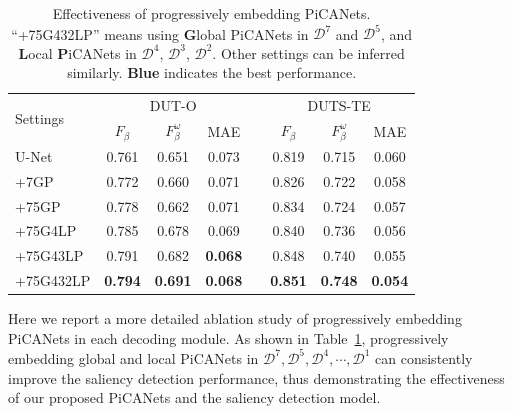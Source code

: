 \documentclass[10pt,twocolumn,letterpaper]{article}
\def\blu#1{\textbf{\color{blue} #1}} %
\begin{document}
\begin{table} [!t]
\begin{center}
\caption{Effectiveness of progressively embedding PiCANets. ``+75G432LP'' means using \textbf{G}lobal PiCANets in $\mathcal D^7$ and $\mathcal D^5$, and \textbf{L}ocal \textbf{P}iCANets in $\mathcal D^4$, $\mathcal D^3$, $\mathcal D^2$. Other settings can be inferred similarly. \blu{Blue} indicates the best performance.}
\vspace{1mm}
\label{progressiveTab}
\footnotesize
\begin{tabular}{@{}lccccccc@{}}
\toprule
\multirow{2}{*}{Settings} & \multicolumn{3}{c}{DUT-O \cite{yang2013gbmr}}  && \multicolumn{3}{c}{DUTS-TE \cite{wang2017duts}} \\
\cmidrule{2-4} \cmidrule{6-8}
                          &  $F_{\beta}$   &  $F_{\beta}^{\omega}$  &   MAE    && $F_{\beta}$   &  $F_{\beta}^{\omega}$  &   MAE  \\ \midrule
U-Net \cite{ronneberger2015unet} & 0.761   & 0.651                  & 0.073    && 0.819         & 0.715                  & 0.060  \\ \midrule
+7GP                      & 0.772          & 0.660                  & 0.071    && 0.826         & 0.722                  & 0.058  \\
+75GP                     & 0.778          & 0.662                  & 0.071    && 0.834         & 0.724                  & 0.057  \\
+75G4LP                   & 0.785          & 0.678                  & 0.069    && 0.840         & 0.736                  & 0.056  \\
+75G43LP                  & 0.791          & 0.682                  &\blu{0.068}&& 0.848        & 0.740                  & 0.055  \\
+75G432LP                 &\blu{0.794}     &\blu{0.691}             &\blu{0.068}&&\blu{0.851}   &\blu{0.748}             &\blu{0.054}\\
\bottomrule
\end{tabular}
\vspace{-0.7cm}
\end{center}{}
\end{table}

Here we report a more detailed ablation study of progressively embedding PiCANets in each decoding module. As shown in Table~\ref{progressiveTab}, progressively embedding global and local PiCANets in $\mathcal D^7,\mathcal D^5,\mathcal D^4,\cdots,\mathcal D^1$ can consistently improve the saliency detection performance, thus demonstrating the effectiveness of our proposed PiCANets and the saliency detection model.
\end{document}
